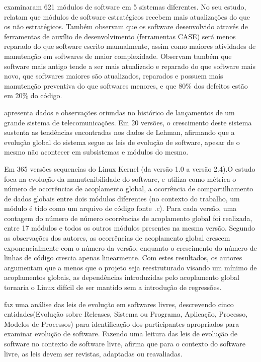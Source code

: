 \cite{kemerer1997determinants} examinaram 621 módulos de software em 5 sistemas diferentes. No seu estudo, relatam que módulos de software estratégicos recebem mais atualizações do que os não estratégicos. Também observam que os software desenvolvido através de ferramentas de auxílio de desenvolvimento (ferramentas CASE) será menos reparado do que software escrito manualmente, assim como maiores atividades de manutenção em softwares de maior complexidade. Observam também que software mais antigo tende a ser mais atualizado e reparado do que software mais novo, que softwares maiores são atualizados, reparados e possuem mais manutenção preventiva do que softwares menores, e que 80\% dos defeitos estão em 20\% do código.

\cite{gall1997software} apresenta dados e observações oriundas no histórico de lançamentos de um grande sistema de telecomunicações. Em 20 versões, o crescimento deste sistema sustenta as tendências encontradas nos dados de Lehman, afirmando que a evolução global do sistema segue as leis de evolução de software, apesar de o mesmo não acontecer em subsistemas e módulos do mesmo.

Em \cite{schach2002maintainability} 365 versões sequencias do Linux Kernel (da versão 1.0 a versão
2.4).O estudo foca na evolução da manutenibilidade do software, e utiliza como métrica o número de ocorrências de acoplamento global, a ocorrência de compartilhamento de dados globais entre dois módulos diferentes (no contexto do trabalho, um módulo é tido como um arquivo de código fonte \textit{.c}).  Para cada versão, uma contagem do número de número ocorrências de acoplamento global foi realizada, entre 17 módulos e todos os outros módulos presentes na mesma versão. Segundo as observações dos autores, as ocorrências de acoplamento global crescem exponencialmente com o número da
versão, enquanto o crescimento do número de linhas de código
crescia apenas linearmente. Com estes resultados, os autores argumentam que
a menos que o projeto seja reestruturado visando um mínimo de acoplamentos globais, as
dependências introduzidas pelo acoplamento global tornaria o Linux difícil de ser mantido
sem a introdução de regressões.

\cite{scacchi2003understanding} faz uma análise das leis de evolução em softwares livres, descrevendo cinco entidades(Evolução sobre Releases, Sistema ou Programa, Aplicação, Processo, Modelos de Processos) para identificação dos participantes apropriados para examinar evolução de software. Fazendo uma leitura das leis de evolução de software no contexto de software livre, afirma que para o contexto do software livre, as leis devem ser revistas, adaptadas ou reavaliadas.

